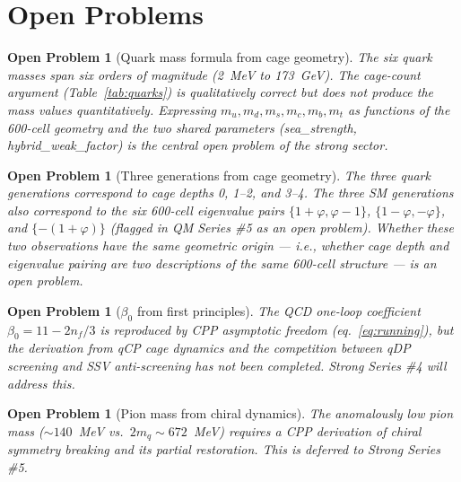 \documentclass[11pt,a4paper]{article}
\newtheorem{openprob}[theorem]{Open Problem}
\newcommand{\phig}{\varphi}
\begin{document}
\section{Open Problems}

\begin{openprob}[Quark mass formula from cage geometry]
\label{op:fermion_mass}
The six quark masses span six orders of magnitude (2~MeV to
173~GeV).  The cage-count argument (Table~\ref{tab:quarks})
is qualitatively correct but does not produce the mass values
quantitatively.  Expressing $m_u, m_d, m_s, m_c, m_b, m_t$ as
functions of the 600-cell geometry and the two shared parameters
(sea\_strength, hybrid\_weak\_factor) is the central open problem
of the strong sector.
\end{openprob}

\begin{openprob}[Three generations from cage geometry]
\label{op:generations}
The three quark generations correspond to cage depths 0, 1--2,
and 3--4.  The three SM generations also correspond to the six
600-cell eigenvalue pairs $\{1+\phig,\phig-1\}$,
$\{1-\phig,-\phig\}$, and $\{-(1+\phig)\}$ (flagged in QM
Series \#5 as an open problem).  Whether these two observations
have the same geometric origin --- i.e., whether cage depth and
eigenvalue pairing are two descriptions of the same 600-cell
structure --- is an open problem.
\end{openprob}

\begin{openprob}[$\beta_0$ from first principles]
\label{op:beta}
The QCD one-loop coefficient $\beta_0 = 11 - 2n_f/3$ is
reproduced by CPP asymptotic freedom (eq.~\ref{eq:running}),
but the derivation from qCP cage dynamics and the competition
between qDP screening and SSV anti-screening has not been
completed.  Strong Series \#4 will address this.
\end{openprob}

\begin{openprob}[Pion mass from chiral dynamics]
\label{op:pion}
The anomalously low pion mass ($\sim 140$~MeV vs.\
$2m_q \sim 672$~MeV) requires a CPP derivation of chiral symmetry
breaking and its partial restoration.  This is deferred to
Strong Series \#5.
\end{openprob}

\end{document}
